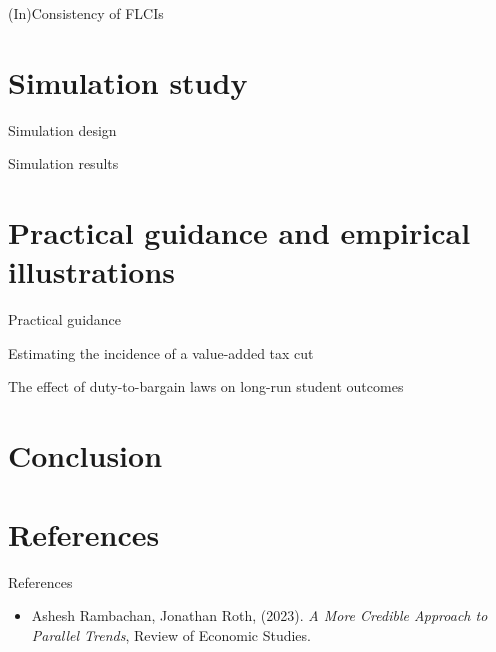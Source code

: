 \documentclass[xcolor=svgnames,aspectratio=169]{beamer}
\begin{document}
\begin{frame}{(In)Consistency of FLCIs}
    \begin{itemize}
    \end{itemize}
\end{frame}

\section{Simulation study}

\begin{frame}{Simulation design}
    \begin{itemize}
    \end{itemize}
\end{frame}

\begin{frame}{Simulation results}
    \begin{itemize}
    \end{itemize}
\end{frame}

\section{Practical guidance and empirical illustrations}

\begin{frame}{Practical guidance}
    \begin{itemize}
    \end{itemize}
\end{frame}

\begin{frame}{Estimating the incidence of a value-added tax cut}
    \begin{itemize}
    \end{itemize}
\end{frame}

\begin{frame}{The effect of duty-to-bargain laws on long-run student outcomes}
    \begin{itemize}
    \end{itemize}
\end{frame}

\section{Conclusion}

\section{References}

\begin{frame}{References}
    \begin{itemize}
        \item Ashesh Rambachan, Jonathan Roth, (2023). 
        \textit{A More Credible Approach to Parallel Trends}, Review of Economic Studies.
    \end{itemize}
\end{frame}
\end{document}
